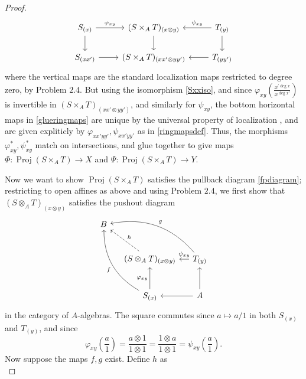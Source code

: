 \documentclass[12pt,letterpaper]{article}
\theoremstyle{definition}
\theoremstyle{remark}
\numberwithin{equation}{section}
\numberwithin{figure}{problem}
\DeclareMathOperator{\Proj}{Proj}
\begin{document}
\begin{proof}
  \begin{equation}\label{glueringmaps}
    \begin{tikzcd}
      S_{(x)} \rar{\varphi_{xy}}\dar & (S \times_A T)_{(x \otimes y)}\dar & \arrow{l}[swap]{\psi_{xy}} T_{(y)}\dar\\
      S_{(xx')} \rar & (S \times_A T)_{(xx' \otimes yy')} & \arrow{l} T_{(yy')}
    \end{tikzcd}
  \end{equation}
  where the vertical maps are the standard localization maps restricted to degree zero, by Problem $2.4$. But using the isomorphism \eqref{Sxxiso}, and since $\varphi_{xy}(\frac{x^{\prime\deg x}}{x^{\deg x'}})$ is invertible in $(S \times_A T)_{(xx' \otimes yy')}$, and similarly for $\psi_{xy}$, the bottom horizontal maps in \eqref{glueringmaps} are unique by the universal property of localization \cite[Prop.~3.1]{AM69}, and are given expliticly by $\varphi_{xx'yy'},\psi_{xx'yy'}$ as in \eqref{ringmapsdef}. Thus, the morphisms $\varphi^*_{xy},\psi^*_{xy}$ match on intersections, and glue together to give maps $\Phi\colon \Proj(S \times_A T) \to X$ and $\Psi\colon \Proj(S \times_A T) \to Y$.
  \par Now we want to show $\Proj(S \times_A T)$ satisfies the pullback diagram \eqref{fpdiagram}; restricting to open affines as above and using Problem $2.4$, we first show that $(S \otimes_A T)_{(x \otimes y)}$ satisfies the pushout diagram
  \begin{equation}\label{podiagram}
    \begin{tikzcd}[column sep=small,row sep=large]
      B\arrow[bend left,leftarrow]{drr}{g}\arrow[bend right,leftarrow]{ddr}[swap]{f}\arrow[dashed,leftarrow]{dr}{h}\\
      &(S \otimes_A T)_{(x \otimes y)}\dar[swap,leftarrow]{\varphi_{xy}} \rar[leftarrow]{\psi_{xy}} & T_{(y)}\dar[leftarrow]\\
      &S_{(x)} \rar[leftarrow] & A
    \end{tikzcd}
  \end{equation}
  in the category of $A$-algebras. The square commutes since $a \mapsto a/1$ in both $S_{(x)}$ and $T_{(y)}$, and since
  \begin{equation*}
    \varphi_{xy}\left( \frac{a}{1} \right) = \frac{a \otimes 1}{1 \otimes 1} = \frac{1 \otimes a}{1 \otimes 1} = \psi_{xy}\left( \frac{a}{1} \right).
  \end{equation*}
  Now suppose the maps $f,g$ exist. Define $h$ as
  \begin{equation}\label{hdef}

\end{equation}
\end{proof}
\end{document}
